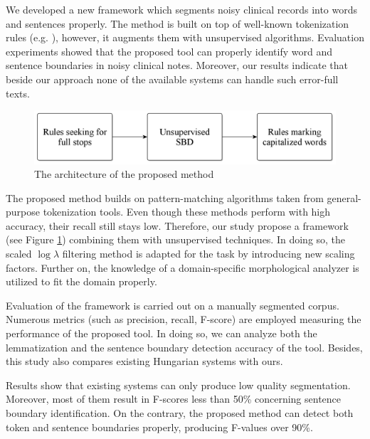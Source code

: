 \begin{core}
\begin{thesis}%
\label{thes:clin-segment}
We developed a new framework which segments noisy clinical records into words and sentences properly.
The method is built on top of well-known tokenization rules (e.g. \cite{Halacsy2004}), however, it augments them with unsupervised algorithms.
Evaluation experiments showed that the proposed tool can properly identify word and sentence boundaries in noisy clinical notes. 
Moreover, our results indicate that beside our approach none of the available systems can handle such error-full texts.
\end{thesis}

\begin{pub}
\cite{Orosz2013d, Orosz2014a}
\end{pub}
\end{core}

\begin{figure}[H]
  \centering
  \includegraphics[scale=0.2]{Clinical/clin_segm_arch.png} 
  \caption{The architecture of the proposed method}
  \label{fig:clin-segment-arch_en}
\end{figure}

The proposed method builds on pattern-matching algorithms taken from general-purpose tokenization tools.
Even though these methods perform with high accuracy, their recall still stays low.
Therefore, our study propose a framework (see Figure \ref{fig:clin-segment-arch_en}) combining them with unsupervised techniques.
In doing so, the scaled $\log\lambda$ filtering method \cite{kiss2006unsupervised} is adapted for the task by introducing new scaling factors.
Further on, the knowledge of a domain-specific morphological analyzer is utilized to fit the domain properly.

Evaluation of the framework is carried out on a manually segmented corpus. 
Numerous metrics (such as precision, recall, F-score) are employed measuring the performance of the proposed tool.
In doing so, we can analyze both the lemmatization and the sentence boundary detection accuracy of the tool.
Besides, this study also compares existing Hungarian systems with ours.

Results show that existing systems can only produce low quality segmentation.
Moreover, most of them result in F-scores less than 50\% concerning sentence boundary identification.
On the contrary, the proposed method can detect both token and sentence boundaries properly, producing F-values over 90\%.


